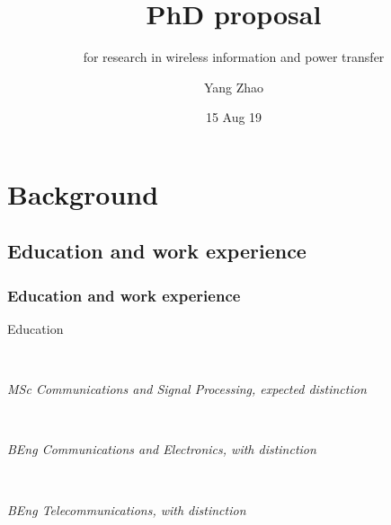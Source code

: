 \documentclass{beamer}
\title{PhD proposal}
\subtitle{for research in wireless information and power transfer}
\author{Yang Zhao}
\institute[IC]{Imperial College London}
\date{15 Aug 19}
\begin{document}
\frame{\titlepage}



\section{Background}
\subsection{Education and work experience}

\begin{frame}
\frametitle{Education and work experience}

\begin{block}{Education}

\begin{minipage}[t]{0.7\textwidth}
\end{minipage}
~
\begin{minipage}[t]{0.2\textwidth}
\end{minipage}

\textit{MSc Communications and Signal Processing, expected distinction} \\

\begin{minipage}[t]{0.7\textwidth}
\end{minipage}
~
\begin{minipage}[t]{0.2\textwidth}
\end{minipage}

\textit{BEng Communications and Electronics, with distinction} \\

\begin{minipage}[t]{0.7\textwidth}
\end{minipage}
~
\begin{minipage}[t]{0.2\textwidth}
\end{minipage}

\textit{BEng Telecommunications, with distinction}
\end{block}

\end{frame}
\end{document}
